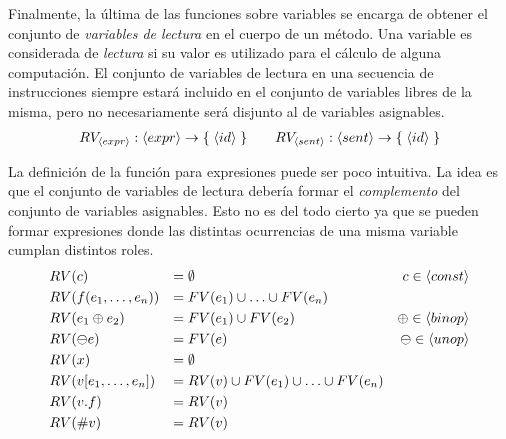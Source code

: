 \documentclass{article}
\begin{document}
Finalmente, la última de las funciones sobre variables se encarga de obtener el conjunto de \textit{variables de lectura} en el cuerpo de un método.
Una variable es considerada de \textit{lectura} si su valor es utilizado para el cálculo de alguna computación.
El conjunto de variables de lectura en una secuencia de instrucciones siempre estará incluido en el conjunto de variables libres de la misma, pero no necesariamente será disjunto al de variables asignables.
\begin{gather*}
RV_{\langle expr \rangle}: \langle expr \rangle \rightarrow \{ \; \langle id \rangle \; \}
\qquad
RV_{\langle sent \rangle}: \langle sent \rangle \rightarrow \{ \; \langle id \rangle \; \}
\end{gather*}

La definición de la función para expresiones puede ser poco intuitiva.
La idea es que el conjunto de variables de lectura debería formar el \textit{complemento} del conjunto de variables asignables.
Esto no es del todo cierto ya que se pueden formar expresiones donde las distintas ocurrencias de una misma variable cumplan distintos roles.
\begin{align*}
&RV(c)
&=&\;
\emptyset
&c \in \langle const \rangle
\\
&RV(f(e_1, \ldots, e_n))
&=&\;
FV(e_1) \cup \ldots \cup FV(e_n)
\\
&RV(e_1 \oplus e_2)
&=&\;
FV(e_1) \cup FV(e_2)
&\oplus \in \langle binop \rangle
\\
&RV(\ominus e)
&=&\;
FV(e)
&\ominus \in \langle unop \rangle
\\
&RV(x)
&=&\;
\emptyset
\\
&RV(v [e_1, \ldots, e_n])
&=&\;
RV(v) \cup FV(e_1) \cup \ldots \cup FV(e_n)
\\
&RV(v.f)
&=&\;
RV(v)
\\
&RV(\# v)
&=&\;
RV(v)
\end{align*}
\end{document}
